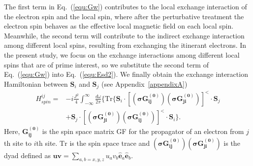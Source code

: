 \documentclass[aps,prb,twocolumn,showpacs,amssymb]{revtex4-1}
\begin{document}
The first term in Eq.~(\ref{equ:Gw}) contributes to the local exchange interaction of the electron spin and the local spin, where after the perturbative treatment the electron spin behaves as the effective local magnetic field on each local spin. Meanwhile, the second term will contribute to the indirect exchange interaction among different local spins, resulting from exchanging the itinerant electrons. In the present study, we focus on the exchange interactions among different local spins that are of prime interest, so we substitute the second term of Eq.~(\ref{equ:Gw}) into Eq.~(\ref{equ:Esd2}). We finally obtain the exchange interaction Hamiltonian between $\bm{S}_i$ and $\bm{S}_j$ (see Appendix~\ref{appendixA})
\begin{equation}\label{equ:Esd3}
\begin{aligned}
H_{spin}^{ij}=&-i\frac{J^2}{4}\int^{\infty}_{-\infty}\frac{d\omega}{2\pi}\{\mathrm{Tr}\{
\bm{S}_{i}\cdot[(\bm{\sigma}\bm{G^{(0)}_{ij}})(\bm{\sigma}\bm{G^{(0)}_{ji}})]^{<}\cdot\bm{S}_{j}\\
&+\bm{S}_{j}\cdot[(\bm{\sigma}\bm{G^{(0)}_{ji}})(\bm{\sigma}\bm{G^{(0)}_{ij}})]^{<}\cdot\bm{S}_{i}\}.
\end{aligned}
\end{equation}
Here, $\bm{G^{(0)}_{ij}}$ is the spin space matrix GF for the propagator of an electron from $j$th site to $i$th site. $\mathrm{Tr}$ is the spin space trace and $(\bm{\sigma}\bm{G^{(0)}_{ij}})(\bm{\sigma}\bm{G^{(0)}_{ji}})$ is the dyad defined as $\bm{u}\bm{v}=\sum_{a,b=x,y,z}u_av_b\hat{\bm{e}}_a\hat{\bm{e}}_b$. %
\end{document}
